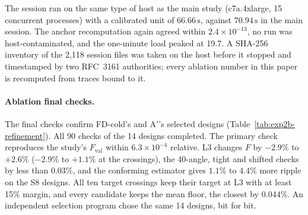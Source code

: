 \documentclass{anvil-paper}
\begin{document}
The session ran on the same type of host as the main study (c7a.4xlarge,
15 concurrent processes) with a calibrated unit of $66.66\,\mathrm{s}$,
against $70.94\,\mathrm{s}$ in the main session. The anchor recomputation
again agreed within $2.4\times10^{-13}$, no run was host-contaminated, and
the one-minute load peaked at 19.7. A SHA-256 inventory of the 2,118
session files was taken on the host before it stopped and timestamped by
two RFC~3161 authorities; every ablation number in this paper is
recomputed from traces bound to it.

\paragraph{Ablation final checks.}
The final checks confirm FD-cold's and A$'$'s selected designs
(Table~\ref{tab:exp2b-refinement}). All 90 checks of the 14 designs
completed. The primary check reproduces the study's $F_{\mathrm{val}}$
within $6.3\times10^{-4}$ relative. L3 changes $F$ by $-2.9\%$ to $+2.6\%$
($-2.9\%$ to $+1.1\%$ at the crossings), the 40-angle, tight and shifted
checks by less than $0.03\%$, and the conforming estimator gives $1.1\%$ to
$4.4\%$ more ripple on the S8 designs. All ten target crossings keep
their target at L3 with at least 15\% margin, and every candidate keeps the
mean floor, the closest by 0.044\%. An independent selection program chose
the same 14 designs, bit for bit.

\begin{table}[H]\centering\small
\caption{Post-hoc ablation (Section~\ref{sec:exp2-fd}): charged time units
to the first attaining validation for A$'$ and FD-cold, repeat~1, and their
ratio per start; the last column gives the geometric mean, with repeat~2 in
parentheses. Units are those of the ablation session.}
\label{tab:exp2b-ratios}
\end{table}

\begin{table}[H]\centering\small
\caption{Validation charges in the ablation, repeat~1. ``To crossing''
counts the validations up to and including the first attaining one;
``share'' is the fraction of the time to that target charged to validation,
as medians (ranges) over all attained targets and starts; ``run'' is the
range over starts of the fraction of the whole run's charged time spent in
validation.}
\label{tab:exp2b-validation}
\end{table}
\end{document}
